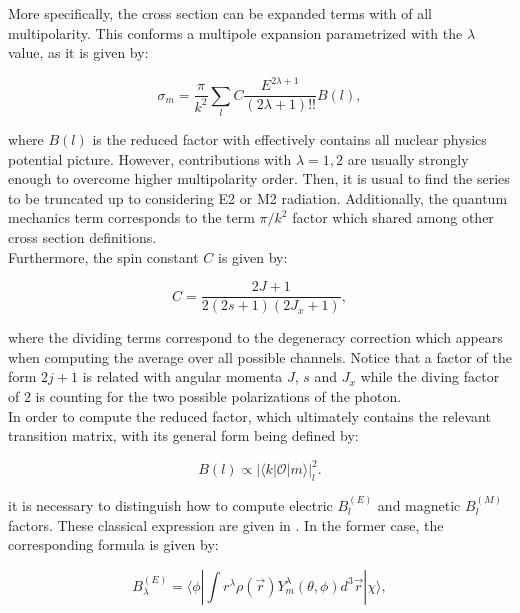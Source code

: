 \documentclass[openany]{book}
\begin{document}
More specifically, the cross section can be expanded terms with of all multipolarity. This conforms a multipole expansion  parametrized with the $\lambda$ value, as it is given by: 

\begin{equation}  \label{eq:radiativeCapture_crossSection_l}
	\sigma_m = \frac{\pi}{k^2} \sum_{l} C \frac{E^{2\lambda +1}}{(2\lambda+1)!!} B(l), 		
\end{equation}

where $B(l)$ is the reduced factor with effectively contains all nuclear physics potential picture. However, contributions with $\lambda = 1, 2$ are usually strongly enough to overcome higher multipolarity order. Then, it is usual to find the series to be truncated up to considering E2 or M2 radiation. Additionally, the quantum mechanics term corresponds to the term $\pi/k^2$ factor which shared among other cross section definitions. \\

Furthermore, the spin constant $C$ is given by: 

\begin{equation} \label{eq:radiativeCapture_spinConstant}
	C =  \frac{ 2J + 1}{2(2s + 1) (2J_x + 1)}, 
\end{equation}

where the dividing terms correspond to the degeneracy correction which appears when computing the average over all possible channels. Notice that a factor of the form $2j +1$ is related with angular momenta $J$, $s$ and $J_x$ while the diving factor of $2$ is counting for the two possible polarizations of the photon.  \\

In order to compute the reduced factor, which ultimately contains the relevant transition matrix, with its general form being defined by:

\begin{equation}  \label{eq:radiativeCapture_reducedFactor}
	B(l) \propto   |{\langle k | \mathcal{O} | m \rangle}|^{2}_{l}.
\end{equation}

 it is necessary to distinguish how to compute electric $B^{(E)}_{l}$ and magnetic $B^{(M)}_{l}$ factors. These classical expression are given in \cite{goldhaber_weneser_1955}. In the former case, the corresponding formula is given by: 

\begin{equation} \label{eq:radiativeCapture_reduced_E}
	B^{(E)}_{\lambda} =   \langle \phi  |  \int  r^\lambda \rho(\vec r) Y^{\lambda}_{m} (\theta, \phi) d^3 \vec r | \chi \rangle, 
\end{equation}
\end{document}
